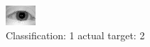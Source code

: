 \begin{figure}[h!]
\begin{center}
\includegraphics[width=0.60\columnwidth]{figures/ID970_class_1_target_2.png}
\end{center}
\caption{ Classification: 1 actual target: 2}
\label{fig:ID970_class_1_target_2}
\end{figure}
